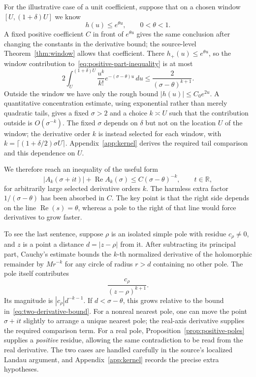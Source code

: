 \documentclass[11pt,openany,oneside]{scrbook}
\theoremstyle{definition}
\theoremstyle{remark}
\newcommand{\RR}{\mathbb R}
\newcommand{\Rea}{\operatorname{Re}}
\begin{document}
For the illustrative case of a unit coefficient, suppose that on a chosen window $[U,(1+\delta)U]$ we know
\begin{equation}\label{eq:local-upper-h}
h(u)\le e^{\theta u},\qquad 0<\theta<1.
\end{equation}
A fixed positive coefficient $C$ in front of $e^{\theta u}$ gives the same conclusion after changing the constants in the derivative bound; the source-level Theorem~\ref{thm:window} allows that coefficient.
There $h_+(u)\le e^{\theta u}$, so the window contribution to~\eqref{eq:positive-part-inequality} is at most
\[
2\int_U^{(1+\delta)U}\frac{u^k}{k!}e^{-(\sigma-\theta)u}\,du
\le\frac{2}{(\sigma-\theta)^{k+1}}.
\]
Outside the window we have only the rough bound $|h(u)|\le C_0e^{2u}$.  A quantitative concentration estimate, using exponential rather than merely quadratic tails, gives a fixed $\sigma>2$ and a choice $k\asymp U$ such that the contribution outside is $O(\sigma^{-k})$.  The fixed $\sigma$ depends on $\delta$ but not on the location $U$ of the window; the derivative order $k$ is instead selected for each window, with $k=\lceil(1+\delta/2)\sigma U\rceil$. Appendix~\ref{app:kernel} derives the required tail comparison and this dependence on $U$.

We therefore reach an inequality of the useful form
\begin{equation}\label{eq:two-derivative-bound}
|A_k(\sigma+it)|+\Rea A_k(\sigma)
\le C(\sigma-\theta)^{-k},\qquad t\in\RR,
\end{equation}
for arbitrarily large selected derivative orders $k$.  The harmless extra factor $1/(\sigma-\theta)$ has been absorbed in $C$.  The key point is that the right side depends on the line $\Rea(s)=\theta$, whereas a pole to the right of that line would force derivatives to grow faster.

To see the last sentence, suppose $\rho$ is an isolated simple pole with residue $c_\rho\ne0$, and $z$ is a point a distance $d=|z-\rho|$ from it.  After subtracting its principal part, Cauchy's estimate bounds the $k$-th normalized derivative of the holomorphic remainder by $Mr^{-k}$ for any circle of radius $r>d$ containing no other pole.  The pole itself contributes
\begin{equation}\label{eq:pole-derivatives}
\frac{c_\rho}{(z-\rho)^{k+1}}.
\end{equation}
Its magnitude is $|c_\rho|d^{-k-1}$.  If $d<\sigma-\theta$, this grows relative to the bound in~\eqref{eq:two-derivative-bound}.  For a nonreal nearest pole, one can move the point $\sigma+it$ slightly to arrange a unique nearest pole; the real-axis derivative supplies the required comparison term.  For a real pole, Proposition~\ref{prop:positive-poles} supplies a \emph{positive} residue, allowing the same contradiction to be read from the real derivative.  The two cases are handled carefully in the source's localized Landau argument, and Appendix~\ref{app:kernel} records the precise extra hypotheses.
\end{document}

